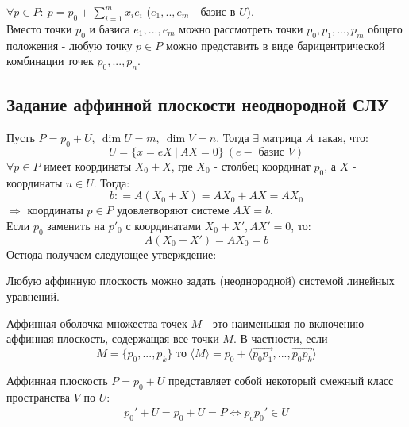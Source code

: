 \begin{remark}
    $\forall p \in P: \ p = p_0 + \sum \limits_{i=1}^m x_ie_i$ ($e_1,..,e_m$ - базис в $U$).\\
    Вместо точки $p_0$ и базиса $e_1,...,e_m$ можно рассмотреть точки $p_0,p_1,...,p_m$ общего положения - любую точку $p \in P$ можно представить в виде барицентрической комбинации точек $p_0,...,p_n$. 
\end{remark} 

\subsection*{Задание аффинной плоскости неоднородной СЛУ}
Пусть $P = p_0 + U, \ \dim U = m, \ \dim V = n$. Тогда $\exists$ матрица $A$ такая, что: 
$$U = \{x = eX \ | \ AX = 0\} \ (e - \text{ базис } V)$$
$\forall p \in P$ имеет координаты $X_0 + X$, где $X_0$ - столбец координат $p_0$, а $X$ - координаты $u \in U$.
Тогда:
$$b: = A(X_0 + X) = AX_0 + AX = AX_0 $$ 
$\Longrightarrow$ координаты $p \in P$ удовлетворяют системе $AX = b$.\\
Если $p_0$ заменить на $p'_0$ с координатами $X_0 + X', AX' = 0$, то: 
$$A(X_0 + X') = AX_0 = b$$ 
Остюда получаем следующее утверждение:
\begin{subtheorem}
    Любую аффинную плоскость можно задать (неоднородной) системой линейных уравнений.
\end{subtheorem}
\begin{definition}
    Аффинная оболочка множества точек $M$ - это наименьшая по включению аффинная плоскость, содержащая все точки $M$. В частности, если 
    $$M = \{p_0,...,p_k\} \text{ то }  \langle M \rangle = p_0 + \langle \overrightarrow{p_0p_1},...,\overrightarrow{p_0p_k} \rangle$$
\end{definition}

\begin{remark}
    Аффинная плоскость $P=p_0+U$ представляет собой некоторый смежный класс пространства $V$ по $U$:
    \[p_0'+U=p_0+U=P \Longleftrightarrow  \overline{p_op_0'}\in U\]
\end{remark}

